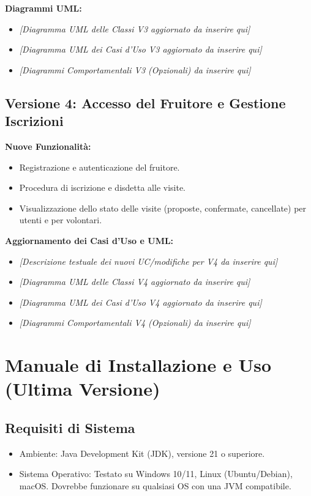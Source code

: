 \documentclass[a4paper,12pt]{article}
\begin{document}
\bigskip
\textbf{Diagrammi UML:}
\begin{itemize}
    \item \textit{[Diagramma UML delle Classi V3 aggiornato da inserire qui]}
    \item \textit{[Diagramma UML dei Casi d'Uso V3 aggiornato da inserire qui]}
    \item \textit{[Diagrammi Comportamentali V3 (Opzionali) da inserire qui]}
\end{itemize}

\newpage
\subsection{Versione 4: Accesso del Fruitore e Gestione Iscrizioni}
\textbf{Nuove Funzionalità:}
\begin{itemize}
    \item Registrazione e autenticazione del fruitore.
    \item Procedura di iscrizione e disdetta alle visite.
    \item Visualizzazione dello stato delle visite (proposte, confermate, cancellate) per utenti e per volontari.
\end{itemize}

\bigskip %
\textbf{Aggiornamento dei Casi d'Uso e UML:}
\begin{itemize}
    \item \textit{[Descrizione testuale dei nuovi UC/modifiche per V4 da inserire qui]}
    \item \textit{[Diagramma UML delle Classi V4 aggiornato da inserire qui]}
    \item \textit{[Diagramma UML dei Casi d'Uso V4 aggiornato da inserire qui]}
    \item \textit{[Diagrammi Comportamentali V4 (Opzionali) da inserire qui]}
\end{itemize}

\newpage
\section{Manuale di Installazione e Uso (Ultima Versione)}

\subsection{Requisiti di Sistema}
\begin{itemize}
    \item Ambiente: Java Development Kit (JDK), versione 21 o superiore.
    \item Sistema Operativo: Testato su Windows 10/11, Linux (Ubuntu/Debian), macOS. Dovrebbe funzionare su qualsiasi OS con una JVM compatibile.
\end{itemize}
\end{document}
